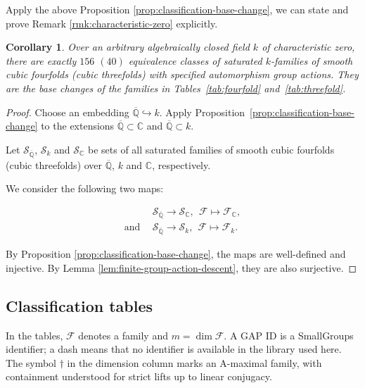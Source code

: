 \documentclass[12pt]{amsart}
\numberwithin{equation}{section}
\theoremstyle{plain}
\newtheorem{cor}[thm]{Corollary}
\theoremstyle{definition}
\theoremstyle{remark}
\newcommand{\CC}{\mathbb C}
\newcommand{\calF}{\mathcal F}
\begin{document}
Apply the above Proposition \ref{prop:classification-base-change}, we can state and prove Remark \ref{rmk:characteristic-zero} explicitly.

\begin{cor}\label{cor:cubic-classification-characteristic-zero}
Over an arbitrary algebraically closed field $k$ of characteristic zero,
there are exactly $156$ $(40)$ equivalence
classes of saturated $k$-families of smooth cubic fourfolds (cubic threefolds) with specified automorphism group actions.
They are the base changes of the families in
Tables~\ref{tab:fourfold} and~\ref{tab:threefold}.
\end{cor}

\begin{proof}
Choose an embedding \(\overline{\mathbb Q}\hookrightarrow k\).
Apply Proposition~\ref{prop:classification-base-change} to the
extensions \(\overline{\mathbb Q}\subset\CC\) and
\(\overline{\mathbb Q}\subset k\).

Let $\mathcal{S}_{\overline{\mathbb{Q}}}$, $\mathcal{S}_{k}$ and $\mathcal{S}_{\mathbb{C}}$ be sets of all saturated families of smooth cubic fourfolds (cubic threefolds) over $\overline{\mathbb{Q}}$, $k$ and $\mathbb{C}$, respectively.

We consider the following two maps:

\begin{eqnarray*}
&\mathcal{S}_{\overline{\mathbb{Q}}} \longrightarrow \mathcal{S}_{\mathbb{C}},\ \
\mathcal{F}\mapsto \mathcal{F}_{\mathbb{C}},\\
\text{and}\ \ &\mathcal{S}_{\overline{\mathbb{Q}}} \longrightarrow \mathcal{S}_{k},\ \
\mathcal{F}\mapsto \mathcal{F}_{k}.
\end{eqnarray*}

By Proposition \ref{prop:classification-base-change}, the maps are well-defined and injective. By Lemma \ref{lem:finite-group-action-descent}, they are also surjective.
\end{proof}

\subsection{Classification tables}

In the tables, $\calF$ denotes a family and $m=\dim\calF$.
A GAP ID is a SmallGroups identifier; a dash means that no identifier
is available in the library used here.
The symbol $\dagger$ in the dimension column marks an A-maximal family,
with containment understood for strict lifts up to linear conjugacy.
\end{document}
